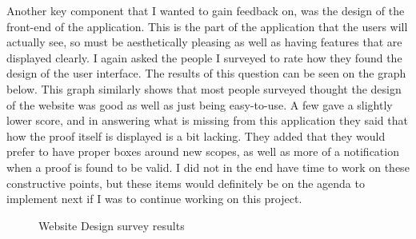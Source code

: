 Another key component that I wanted to gain feedback on, was the design of the front-end of the application. This is the part of the application that the users will actually see, so must be aesthetically pleasing as well as having features that are displayed clearly. I again asked the people I surveyed to rate how they found the design of the user interface. The results of this question can be seen on the graph below. This graph similarly shows that most people surveyed thought the design of the website was good as well as just being easy-to-use. A few gave a slightly lower score, and in answering what is missing from this application they said that how the proof itself is displayed is a bit lacking. They added that they would prefer to have proper boxes around new scopes, as well as more of a notification when a proof is found to be valid. I did not in the end have time to work on these constructive points, but these items would definitely be on the agenda to implement next if I was to continue working on this project. 

\begin{figure}[!ht]
	\centering
	\caption{Website Design survey results}
\end{figure}

